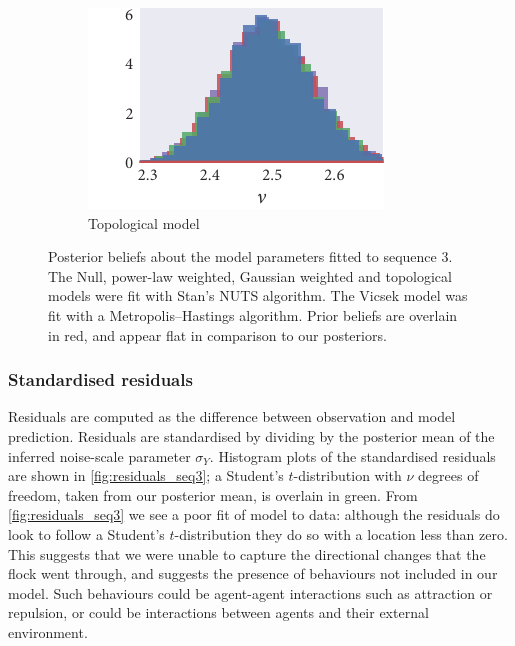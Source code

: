 \begin{figure}[p]
\begin{subfigure}[b]{\textwidth}
    \includegraphics{seq3/top_hist_nu.pdf}%
    \caption{Topological model}
  \end{subfigure}
  \vspace{-2em}
  \caption{Posterior beliefs about the model parameters fitted to sequence $3$.
    The Null, power-law weighted, Gaussian weighted and topological models were
    fit with Stan's NUTS algorithm. The Vicsek model was fit with a
    Metropolis--Hastings algorithm. Prior beliefs are overlain in red, and
    appear flat in comparison to our posteriors.}
  \label{fig:posteriors_seq3}
\end{figure}

\subsubsection{Standardised residuals}

Residuals are computed as the difference between observation and model
prediction. Residuals are standardised by dividing by the posterior mean of the
inferred noise-scale parameter $\sigma_Y$. Histogram plots of the standardised
residuals are shown in \cref{fig:residuals_seq3}; a Student's $t$-distribution
with $\nu$ degrees of freedom, taken from our posterior mean, is overlain in
green. From \cref{fig:residuals_seq3} we see a poor fit of model to data:
although the residuals do look to follow a Student's $t$-distribution they do
so with a location less than zero. This suggests that we were unable to capture
the directional changes that the flock went through, and suggests the presence
of behaviours not included in our model. Such behaviours could be agent-agent
interactions such as attraction or repulsion, or could be interactions between
agents and their external environment.

